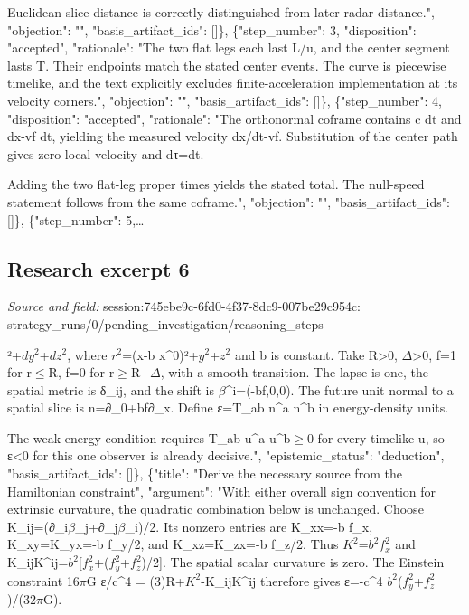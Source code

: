 \documentclass[11pt]{article}
\begin{document}
Euclidean slice distance is correctly distinguished from later radar distance.", "objection": "", "basis\_artifact\_ids": []\}, \{"step\_number": 3, "disposition": "accepted", "rationale": "The two flat legs each last L/u, and the center segment lasts T. Their endpoints match the stated center events. The curve is piecewise timelike, and the text explicitly excludes finite-acceleration implementation at its velocity corners.", "objection": "", "basis\_artifact\_ids": []\}, \{"step\_number": 4, "disposition": "accepted", "rationale": "The orthonormal coframe contains c dt and dx-vf dt, yielding the measured velocity dx/dt-vf. Substitution of the center path gives zero local velocity and dτ=dt.

Adding the two flat-leg proper times yields the stated total. The null-speed statement follows from the same coframe.", "objection": "", "basis\_artifact\_ids": []\}, \{"step\_number": 5,…

\subsection{Research excerpt 6}
\textit{Source and field: }session:745ebe9c-6fd0-4f37-8dc9-007be29c954c: strategy\_runs/0/pending\_investigation/reasoning\_steps\par
[\{"title": "Specify the geometry and the observer-dependent test", "argument": "Use coordinates x\textasciicircum{}0=ct and metric $ds^{2}$=-(dx\textasciicircum{}0)²+[dx-b f(r)dx\textasciicircum{}0]²+$dy^{2}$+$dz^{2}$, where $r^{2}$=(x-b x\textasciicircum{}0)²+$y^{2}$+$z^{2}$ and b is constant. Take R\textgreater{}0, $\Delta$\textgreater{}0, f=1 for r$\leq$R, f=0 for r$\geq$R+$\Delta$, with a smooth transition. The lapse is one, the spatial metric is δ\_ij, and the shift is $\beta$\textasciicircum{}i=(-bf,0,0). The future unit normal to a spatial slice is n=∂\_0+bf∂\_x. Define ε=T\_ab n\textasciicircum{}a n\textasciicircum{}b in energy-density units.

The weak energy condition requires T\_ab u\textasciicircum{}a u\textasciicircum{}b$\geq$0 for every timelike u, so ε\textless{}0 for this one observer is already decisive.", "epistemic\_status": "deduction", "basis\_artifact\_ids": []\}, \{"title": "Derive the necessary source from the Hamiltonian constraint", "argument": "With either overall sign convention for extrinsic curvature, the quadratic combination below is unchanged. Choose K\_ij=(∂\_i$\beta$\_j+∂\_j$\beta$\_i)/2. Its nonzero entries are K\_xx=-b f\_x, K\_xy=K\_yx=-b f\_y/2, and K\_xz=K\_zx=-b f\_z/2. Thus $K^{2}$=$b^{2}$$f_x^{2}$ and K\_ijK\textasciicircum{}ij=$b^{2}$[$f_x^{2}$+($f_y^{2}$+$f_z^{2}$)/2]. The spatial scalar curvature is zero. The Einstein constraint 16$\pi$G ε/c\textasciicircum{}4 = (3)R+$K^{2}$-K\_ijK\textasciicircum{}ij therefore gives ε=-c\textasciicircum{}4 $b^{2}$($f_y^{2}$+$f_z^{2}$)/(32$\pi$G).
\end{document}
